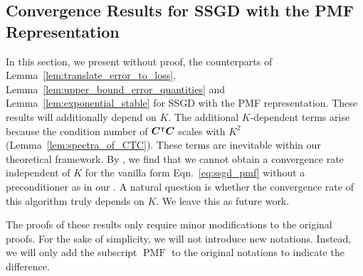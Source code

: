 \subsection{Convergence Results for SSGD with the PMF Representation}\label{Appendix:convergece_ssgd_pmf}
In this section, we present without proof, the counterparts of Lemma~\ref{lem:translate_error_to_loss}, Lemma~\ref{lem:upper_bound_error_quantities} and Lemma~\ref{lem:exponential_stable} for SSGD with the PMF representation.
These results will additionally depend on $K$.
The additional $K$-dependent terms arise because the condition number of ${\bm{C}}^{\intercal}{\bm{C}}$ scales with $K^2$ (Lemma~\ref{lem:spectra_of_CTC}).
These terms are inevitable within our theoretical framework. 
By \citep[Theorem~1][]{samsonov2024improved}, we find that we cannot obtain a convergence rate independent of $K$ for the vanilla form Eqn.~\eqref{eq:ssgd_pmf} without a preconditioner as in our {\LCTD}. 
A natural question is whether the convergence rate of this algorithm truly depends on $K$. 
We leave this as future work.

The proofs of these results only require minor modifications to the original proofs.
For the sake of simplicity, we will not introduce new notations. 
Instead, we will only add the subscript $\operatorname{PMF}$ to the original notations to indicate the difference.

